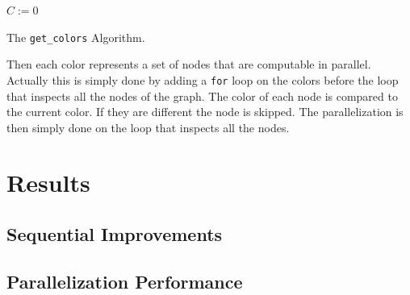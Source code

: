 \documentclass[fleqn,11pt]{SelfArx} %
\theoremstyle{definition}
\begin{document}
\begin{algorithm}[h]
\SetAlgoLined
{}

\BlankLine

$C := 0$\;

\caption{The \texttt{get\_colors} Algorithm.}
\label{getcolors}
\end{algorithm}

Then each color represents a set of nodes that are computable in parallel. Actually this is simply done by adding a \verb+for+ loop on the colors before the loop that inspects all the nodes of the graph. The color of each node is compared to the current color. If they are different the node is skipped. The parallelization is then simply done on the loop that inspects all the nodes.


\section{Results}

\subsection{Sequential Improvements}

\subsection{Parallelization Performance}
\end{document}
